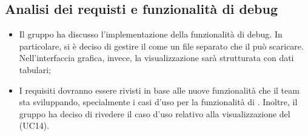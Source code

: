 \subsection{Analisi dei requisti e funzionalità di debug}
\begin{itemize}
	\item Il gruppo ha discusso l'implementazione della funzionalità di debug. In particolare, si è deciso di gestire il  come un file separato che il  può scaricare. Nell'interfaccia grafica, invece, la visualizzazione sarà strutturata con dati tabulari;
	\item I requisiti dovranno essere rivisti in base alle nuove funzionalità che il team sta sviluppando, specialmente i casi d'uso per la funzionalità di . Inoltre, il gruppo ha deciso di rivedere il caso d'uso relativo alla visualizzazione del (UC14).
\end{itemize}

